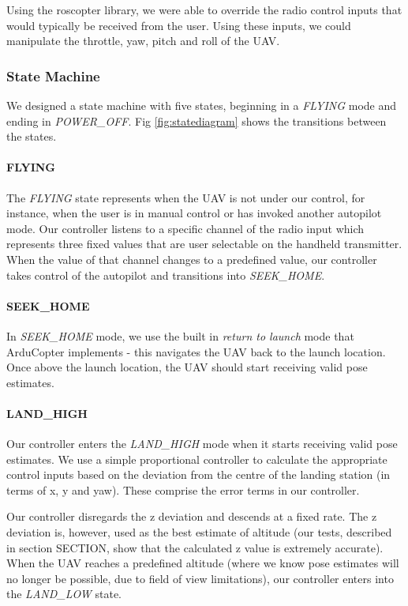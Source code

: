 \documentclass[10pt]{scrartcl} %
\begin{document}
Using the roscopter library, we were able to override the radio control inputs that would typically be received from the user. Using these inputs, we could manipulate the throttle, yaw, pitch and roll of the UAV.

\subsubsection{State Machine}
We designed a state machine with five states, beginning in a \textit{FLYING} mode and ending in \textit{POWER\_OFF}. Fig \ref{fig:statediagram} shows the transitions between the states. 

\paragraph{FLYING}
The \textit{FLYING} state represents when the UAV is not under our control, for instance, when the user is in manual control or has invoked another autopilot mode. Our controller listens to a specific channel of the radio input which represents three fixed values that are user selectable on the handheld transmitter. When the value of that channel changes to a predefined value, our controller takes control of the autopilot and transitions into \textit{SEEK\_HOME}.

\paragraph{SEEK\_HOME}
In \textit{SEEK\_HOME} mode, we use the built in \textit{return to launch} mode that ArduCopter implements - this navigates the UAV back to the launch location. Once above the launch location, the UAV should start receiving valid pose estimates.

\paragraph{LAND\_HIGH}
Our controller enters the \textit{LAND\_HIGH} mode when it starts receiving valid pose estimates. We use a simple proportional controller to calculate the appropriate control inputs based on the deviation from the centre of the landing station (in terms of x, y and yaw). These comprise the error terms in our controller.

Our controller disregards the z deviation and descends at a fixed rate. The z deviation is, however, used as the best estimate of altitude (our tests, described in section SECTION, show that the calculated z value is extremely accurate). When the UAV reaches a predefined altitude (where we know pose estimates will no longer be possible, due to field of view limitations), our controller enters into the \textit{LAND\_LOW} state.
\end{document}
